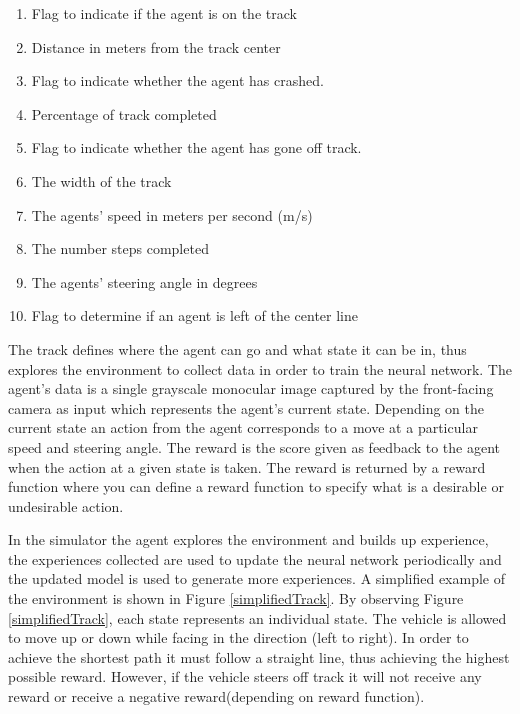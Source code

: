 \documentclass[journal]{IEEEtran}
\begin{document}
\begin{enumerate}
  \item Flag to indicate if the agent is on the track
  \item Distance in meters from the track center
  \item Flag to indicate whether the agent has crashed.
  \item Percentage of track completed
  \item Flag to indicate whether the agent has gone off track.
  \item The width of the track
  \item The agents’ speed in meters per second (m/s)
  \item The number steps completed
  \item The agents’ steering angle in degrees
  \item Flag to determine if an agent is left of the center line
\end{enumerate}

The track defines where the agent can go and what state it can be in, thus explores the environment to collect data in order to train the neural network. The agent's data is a single grayscale monocular image captured by the front-facing camera as input which represents the agent's current state. Depending on the current state an action from the agent corresponds to a move at a particular speed and steering angle. The reward is the score given as feedback to the agent when the action at a given state is taken.  The reward is returned by a reward function where you can define a reward function to specify what is a desirable or undesirable action.

In the simulator the agent explores the environment and builds up experience, the experiences collected are used to update the neural network periodically and the updated model is used to generate more experiences.   A simplified example of the environment is shown in Figure \ref{simplifiedTrack}.  By observing Figure \ref{simplifiedTrack}, each state represents an individual state. The vehicle is allowed to move up or down while facing in the direction (left to right). In order to achieve the shortest path it must follow a straight line, thus achieving the highest possible reward.  However, if the vehicle steers off track it will not receive any reward or receive a negative reward(depending on reward function).
\end{document}
